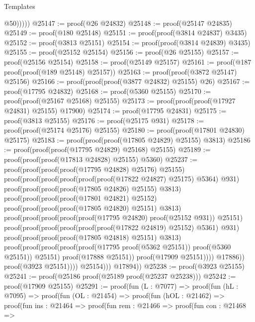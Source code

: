\begin{lexlean}{Templates}
\begin{coremodule}
                      @50)))))
@25147 := proof(@26 @24832)
@25148 := proof(@25147 @24835)
@25149 := proof(@180 @25148)
@25151 := proof(proof(@3814 @24837) @3435)
@25152 := proof(@3813 @25151)
@25154 := proof(proof(@3814 @24839) @3435)
@25155 := proof(@25152 @25154)
@25156 := proof(@26 @25155)
@25157 := proof(@25156 @25154)
@25158 := proof(@25149 @25157)
@25161 := proof(@187 proof(proof(@189 @25148) @25157))
@25163 := proof(proof(@3872 @25147) @25156)
@25166 := proof(proof(proof(@3877 @24832) @25155) @26)
@25167 := proof(@17795 @24832)
@25168 := proof(@5360 @25155)
@25170 := proof(proof(@25167 @25168) @25155)
@25173 := proof(proof(proof(@17927 @24831) @25155) @17900)
@25174 := proof(@17795 @24831)
@25175 := proof(@3813 @25155)
@25176 := proof(@25175 @931)
@25178 := proof(proof(@25174 @25176) @25155)
@25180 := proof(proof(@17801 @24830) @25175)
@25183 := proof(proof(proof(@17805 @24829) @25155) @3813)
@25186 := proof(proof(proof(@17795 @24829) @25168) @25155)
@25189 := proof(proof(proof(@17813 @24828) @25155) @5360)
@25237 := proof(proof(proof(proof(@17795 @24828) @25176) @25155)
      proof(proof(proof(proof(proof(proof(@17822 @24827) @25175) @5364) @931)
            proof(proof(proof(proof(@17805 @24826) @25155) @3813)
                proof(proof(proof(proof(@17801 @24821) @25152)
                      proof(proof(proof(proof(@17805 @24820) @25151) @3813)
                          proof(proof(proof(proof(proof(@17795 @24820) proof(@25152 @931)) @25151)
                                proof(proof(proof(proof(proof(proof(@17822 @24819) @25152) @5361)
                                        @931)
                                      proof(proof(proof(proof(@17805 @24818) @25151) @3813)
                                          proof(proof(proof(proof(proof(@17795 proof(@5362 @25151))
                                                    proof(@5360 @25151))
                                                  @25151)
                                                proof(@17888 @25151))
                                              proof(@17909 @25151))))
                                    @17886))
                              proof(@3923 @25151))))
                    @25154)))
          @17894))
@25238 := proof(@3923 @25155)
@25241 := proof(@25186 proof(@25189 proof(@25237 @25238)))
@25242 := proof(@17909 @25155)
@25291 := proof(fun (L : @7077) =>
    proof(fun (hL : @7095) =>
      proof(fun (OL : @21454) =>
        proof(fun (hOL : @21462) =>
          proof(fun {ins : @21464} =>
            proof(fun {rem : @21466} =>
              proof(fun {con : @21468} =>

\end{coremodule}
\end{lexlean}
